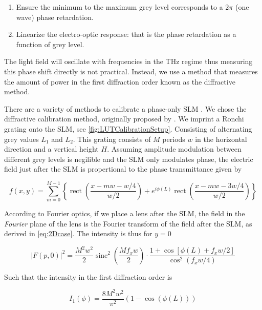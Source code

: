 \begin{enumerate}
    \itemsep=0pt
    
    \item Ensure the minimum to the maximum grey level corresponds to a $2\pi$ (one wave) phase retardation.
    
    \item Linearize the electro-optic response: that is the phase retardation as a function of grey level. 
\end{enumerate}


The light field will oscillate with frequencies in the THz regime thus measuring this phase shift directly is not practical. Instead, we use a method that measures the amount of power in the first diffraction order known as the diffractive method. 

There are a variety of methods to calibrate a phase-only \ac{SLM} \cite{Li2019}. We chose the diffractive calibration method, originally proposed by \cite{Zhang1994}. We imprint a Ronchi grating onto the SLM, see \cref{fig:LUTCalibrationSetup}. Consisting of alternating grey values $L_1$ and $L_2$. This grating consists of $M$ periods $w$ in the horizontal direction and a vertical height $H$. Assuming amplitude modulation between different grey levels is negilible and the SLM only modulates phase, the electric field just after the SLM is propertional to the phase transmittance given by

\begin{equation}\label{eq:FieldAfterSLM}
    f(x,y) = \sum_{m=0}^{M-1} \left\{
    \operatorname{rect}\left(\frac{x-m w - w/4}{w/2}\right) + e^{i \phi(L)} \operatorname{rect}\left(\frac{x - m w - 3 w/4}{w/2}\right)
    \right\}
\end{equation}

According to Fourier optics, if we place a lens after the SLM, the field in the \textit{Fourier} plane of the lens is the Fourier transform of the field after the SLM, as derived in \cref{eq:2Dcase}. The intensity is thus for $y=0$

\begin{equation}\label{eq:FourierIntensity}
    |F(p,0)|^2=
    \frac{M^2 w^2}{2}\operatorname{sinc}^2\left(\frac{M f_x w}{2}\right) \cdot
    \frac{1 + \cos{\left[\phi(L)+f_x w/2\right]}}{\cos^2(f_x w/4)}
\end{equation}

Such that the intensity in the first diffraction order is

\begin{equation}\label{eq:IntensityFirstOrder}
    I_1(\phi) =
    \frac{8M^2w^2}{\pi^2} \left( 
    1-\cos{(\phi(L))}
    \right)
\end{equation}

